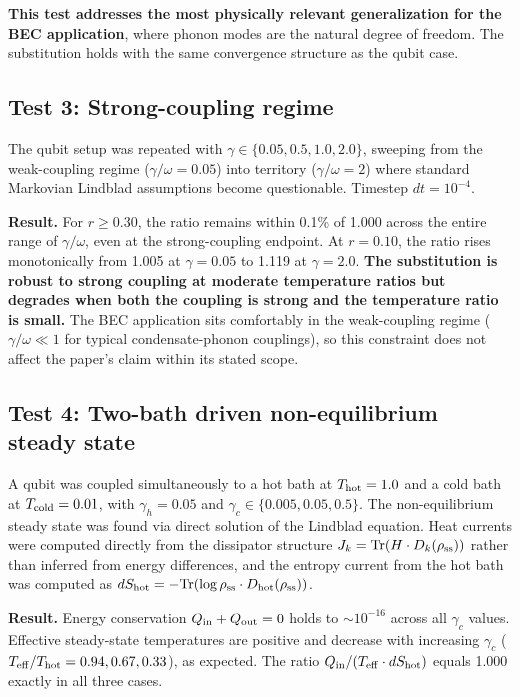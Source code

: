 \documentclass[11pt]{article}
\begin{document}
\textbf{This test addresses the most physically relevant generalization for the BEC application}, where phonon modes are the natural degree of freedom. The substitution holds with the same convergence structure as the qubit case.

\subsection{Test 3: Strong-coupling regime}\label{test-3-strong-coupling-regime}

The qubit setup was repeated with \(\gamma \in \{0.05, 0.5, 1.0, 2.0\}\), sweeping from the weak-coupling regime (\(\gamma/\omega = 0.05\)) into territory (\(\gamma/\omega = 2\)) where standard Markovian Lindblad assumptions become questionable. Timestep \(dt = 10^{-4}\).

\textbf{Result.} For \(r \geq 0.30\), the ratio remains within 0.1\% of 1.000 across the entire range of \(\gamma/\omega\), even at the strong-coupling endpoint. At \(r = 0.10\), the ratio rises monotonically from 1.005 at \(\gamma = 0.05\) to 1.119 at \(\gamma = 2.0\). \textbf{The substitution is robust to strong coupling at moderate temperature ratios but degrades when both the coupling is strong and the temperature ratio is small.} The BEC application sits comfortably in the weak-coupling regime (\(\gamma/\omega \ll 1\) for typical condensate-phonon couplings), so this constraint does not affect the paper's claim within its stated scope.

\subsection{Test 4: Two-bath driven non-equilibrium steady state}\label{test-4-two-bath-driven-non-equilibrium-steady-state}

A qubit was coupled simultaneously to a hot bath at \(T_{\rm hot} = 1.0\) and a cold bath at \(T_{\rm cold} = 0.01\), with \(\gamma_h = 0.05\) and \(\gamma_c \in \{0.005, 0.05, 0.5\}\). The non-equilibrium steady state was found via direct solution of the Lindblad equation. Heat currents were computed directly from the dissipator structure \(J_k = \mathrm{Tr}(H \cdot D_k(\rho_{\rm ss}))\) rather than inferred from energy differences, and the entropy current from the hot bath was computed as \(dS_{\rm hot} = -\mathrm{Tr}(\log\rho_{\rm ss} \cdot D_{\rm hot}(\rho_{\rm ss}))\).

\textbf{Result.} Energy conservation \(Q_{\rm in} + Q_{\rm out} = 0\) holds to \(\sim 10^{-16}\) across all \(\gamma_c\) values. Effective steady-state temperatures are positive and decrease with increasing \(\gamma_c\) (\(T_{\rm eff}/T_{\rm hot} = 0.94, 0.67, 0.33\)), as expected. The ratio \(Q_{\rm in}/(T_{\rm eff} \cdot dS_{\rm hot})\) equals 1.000 exactly in all three cases.
\end{document}
